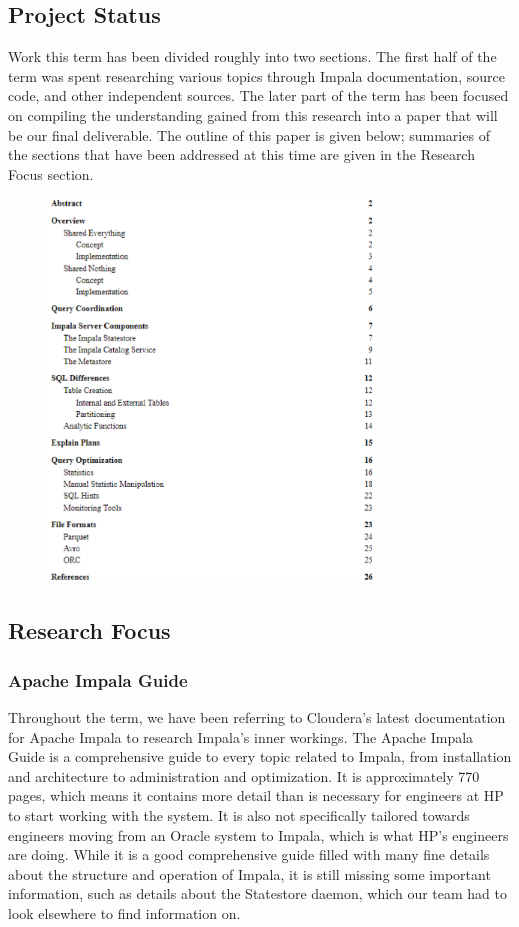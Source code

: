 \documentclass[onecolumn, draftclsnofoot,10pt, compsoc]{IEEEtran}
\begin{document}
\subsection{Project Status}

Work this term has been divided roughly into two sections.
The first half of the term was spent researching various topics through Impala documentation, source code, and other independent sources.
The later part of the term has been focused on compiling the understanding gained from this research into a paper that will be our final deliverable.
The outline of this paper is given below; summaries of the sections that have been addressed at this time are given in the Research Focus section.

\begin{figure}[ht]
    \centering
    \includegraphics[width=\linewidth, height=4in, keepaspectratio]{ToC.eps}
\end{figure}

\subsection{Research Focus}
\subsubsection{Apache Impala Guide}
Throughout the term, we have been referring to Cloudera’s latest documentation for Apache Impala to research Impala’s inner workings.
The Apache Impala Guide is a comprehensive guide to every topic related to Impala, from installation and architecture to administration and optimization.
It is approximately 770 pages, which means it contains more detail than is necessary for engineers at HP to start working with the system.
It is also not specifically tailored towards engineers moving from an Oracle system to Impala, which is what HP’s engineers are doing.
While it is a good comprehensive guide filled with many fine details about the structure and operation of Impala, it is still missing some important information, such as details about the Statestore daemon, which our team had to look elsewhere to find information on. 
\end{document}

